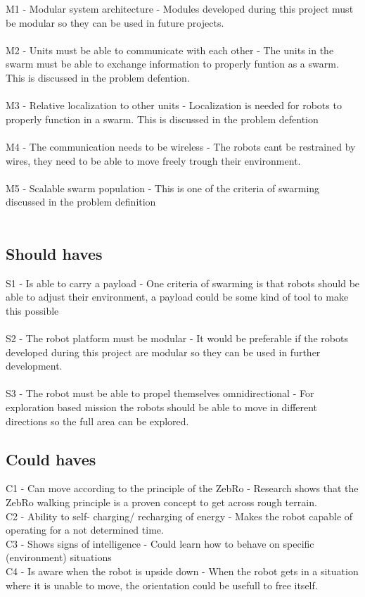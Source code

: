 \documentclass[10pt,a4paper]{article}
\begin{document}
M1 - Modular system architecture - Modules developed during this project must be modular so they can be used in future projects.\\\\
M2 - Units must be able to communicate with each other - The units in the swarm must be able to exchange information to properly funtion as a swarm. This is discussed in the problem defention\cite{multidomaincom}.  \\\\
M3 - Relative localization to other units - Localization is needed for robots to properly function in a swarm. This is discussed in the problem defention\cite{multidomaincom}\\\\
M4 - The communication needs to be wireless - The robots cant be restrained by wires, they need to be able to move freely trough their environment.\\\\
M5 - Scalable swarm population - This is one of the criteria of swarming discussed in the problem definition\\\\


\subsection{Should haves}

S1 - Is able to carry a payload - One criteria of swarming is that robots should be able to adjust their environment, a payload could be some kind of tool to make this possible\\\\
S2 - The robot platform must be modular - It would be preferable if the robots developed during this project are modular so they can be used in further development.\\\\
S3 - The robot must be able to propel themselves omnidirectional - For exploration based mission the robots should be able to move in different directions so the full area can be explored.\\

\subsection{Could haves}

C1 - Can move according to the principle of the ZebRo - Research shows that the ZebRo walking principle is a proven concept to get across rough terrain.\\
C2 - Ability to self- charging/ recharging of energy - Makes the robot capable of operating for a not determined time.\\
C3 - Shows signs of intelligence - Could learn how to behave on specific (environment) situations\\
C4 - Is aware when the robot is upside down - When the robot gets in a situation where it is unable to move, the orientation could be usefull to free itself. \\
\end{document}
